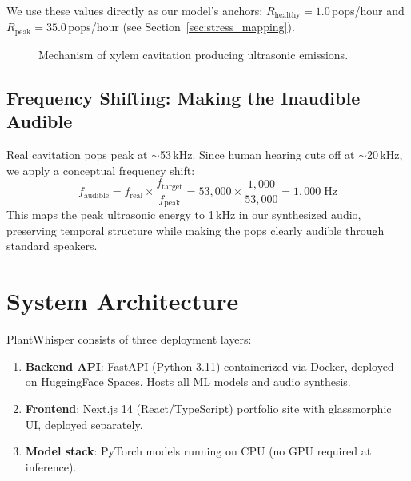 \documentclass[11pt,a4paper,twocolumn]{article}
\begin{document}
We use these values directly as our model's anchors: $R_{\text{healthy}} = 1.0$\,pops/hour and $R_{\text{peak}} = 35.0$\,pops/hour (see Section~\ref{sec:stress_mapping}).

\begin{figure}[H]
    \centering
    \caption{Mechanism of xylem cavitation producing ultrasonic emissions.}
    \label{fig:cavitation}
\end{figure}

\subsection{Frequency Shifting: Making the Inaudible Audible}

Real cavitation pops peak at $\sim$53\,kHz. Since human hearing cuts off at $\sim$20\,kHz, we apply a conceptual frequency shift:
\begin{equation}
    f_{\text{audible}} = f_{\text{real}} \times \frac{f_{\text{target}}}{f_{\text{peak}}} = 53{,}000 \times \frac{1{,}000}{53{,}000} = 1{,}000\;\text{Hz}
\end{equation}
This maps the peak ultrasonic energy to 1\,kHz in our synthesized audio, preserving temporal structure while making the pops clearly audible through standard speakers.


\section{System Architecture}
\label{sec:architecture}

PlantWhisper consists of three deployment layers:

\begin{enumerate}[nosep]
    \item \textbf{Backend API}: FastAPI (Python 3.11) containerized via Docker, deployed on HuggingFace Spaces. Hosts all ML models and audio synthesis.
    \item \textbf{Frontend}: Next.js 14 (React/TypeScript) portfolio site with glassmorphic UI, deployed separately.
    \item \textbf{Model stack}: PyTorch models running on CPU (no GPU required at inference).
\end{enumerate}
\end{document}
